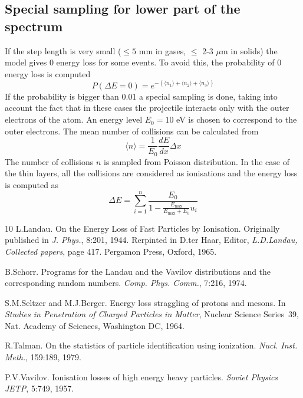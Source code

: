 \documentclass{article}
\newcommand{\Emax}{\ensuremath{E_{\mathrm{max}}}}
\begin{document}
\subsection{Special sampling for lower part of the spectrum}

If the step length is very small ($\leq 5$ mm in gases, $\leq$ 2-3
$\mu$m in solids) the model gives 0 energy loss for some events.  To
avoid this, the probability of 0 energy loss is computed
\begin{equation}
P( \Delta E=0) = e^{-( \langle n_1 \rangle + \langle n_2 \rangle
                     + \langle n_3 \rangle )}
\end{equation}
If the probability is bigger than 0.01 a special sampling is done,
taking into account the fact that in these cases the projectile
interacts only with the outer electrons of the atom.  An energy level
$E_0 = 10$ eV is chosen to correspond to the outer electrons. The mean
number of collisions can be calculated from
\begin{equation}
\langle n \rangle = \frac{1}{E_0} \frac{dE}{dx} \Delta x
\end{equation}
The number of collisions $n$ is sampled from Poisson distribution.
In the case of the thin layers, all the collisions are considered as
ionisations and the energy loss is computed as
\begin{equation}
\Delta E = \sum_{i=1}^n \frac{E_0}
          {1 - \frac {\Emax}{\Emax + E_0} u_i}
\end{equation}


\begin{thebibliography}{10}
L.Landau.
\newblock On the Energy Loss of Fast Particles by Ionisation.
\newblock Originally published in \emph{J. Phys.}, 8:201, 1944.
\newblock Rerpinted in D.ter Haar, Editor, \emph{L.D.Landau, Collected
  papers}, page 417.  Pergamon Press, Oxford, 1965.

B.Schorr.
\newblock Programs for the Landau and the Vavilov distributions and the
  corresponding random numbers.
\newblock \emph{Comp. Phys. Comm.}, 7:216, 1974.

S.M.Seltzer and M.J.Berger.
\newblock Energy loss straggling of protons and mesons.
\newblock In \emph{Studies in Penetration of Charged Particles in
  Matter}, Nuclear Science Series~39, Nat. Academy of Sciences,
  Washington DC, 1964.

R.Talman.
\newblock On the statistics of particle identification using ionization.
\newblock \emph{Nucl. Inst. Meth.}, 159:189, 1979.

P.V.Vavilov.
\newblock Ionisation losses of high energy heavy particles.
\newblock \emph{Soviet Physics JETP}, 5:749, 1957.

\end{thebibliography}
\end{document}
